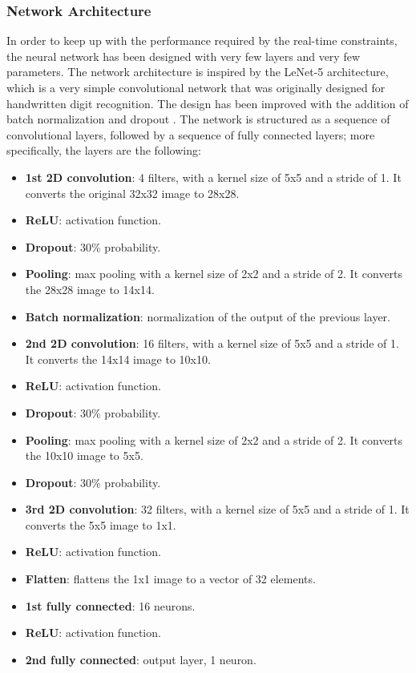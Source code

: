 \documentclass[a4paper,12pt,sort&compress]{article}
\begin{document}
\subsubsection*{Network Architecture}
    In order to keep up with the performance required by the real-time constraints, the neural
    network has been designed with very few layers and very few parameters. The network architecture
    is inspired by the LeNet-5 \citep*{lecun} architecture, which is a very simple convolutional
    network that was originally designed for handwritten digit recognition. The design has been
    improved with the addition of batch normalization \citep*{batch_norm} and dropout
    \citep*{dropout}.
    The network is structured as a sequence of convolutional layers, followed by a sequence of fully
    connected layers; more specifically, the layers are the following:
    \begin{itemize} %
        \item \textbf{1st 2D convolution}: 4 filters, with a kernel size of 5x5 and a stride of 1.
        It converts the original 32x32 image to 28x28.
        \item \textbf{ReLU}: activation function.
        \item \textbf{Dropout}: 30\% probability.
        \item \textbf{Pooling}: max pooling with a kernel size of 2x2 and a stride of 2. It converts
        the 28x28 image to 14x14.
        \item \textbf{Batch normalization}: normalization of the output of the previous layer.
        \item \textbf{2nd 2D convolution}: 16 filters, with a kernel size of 5x5 and a stride of 1.
        It converts the 14x14 image to 10x10.
        \item \textbf{ReLU}: activation function.
        \item \textbf{Dropout}: 30\% probability.
        \item \textbf{Pooling}: max pooling with a kernel size of 2x2 and a stride of 2. It converts
        the 10x10 image to 5x5.
        \item \textbf{Dropout}: 30\% probability.
        \item \textbf{3rd 2D convolution}: 32 filters, with a kernel size of 5x5 and a stride of 1.
        It converts the 5x5 image to 1x1.
        \item \textbf{ReLU}: activation function.
        \item \textbf{Flatten}: flattens the 1x1 image to a vector of 32 elements.
        \item \textbf{1st fully connected}: 16 neurons.
        \item \textbf{ReLU}: activation function.
        \item \textbf{2nd fully connected}: output layer, 1 neuron.
    \end{itemize}  
\end{document}
